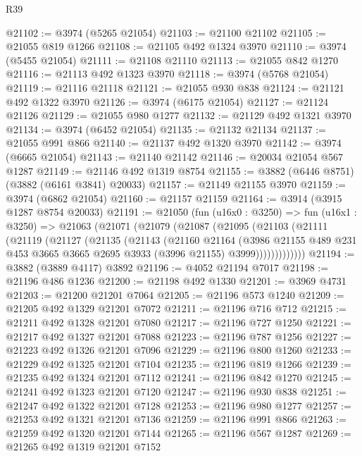\begin{lexlean}{R39}
\begin{coremodule}
@21102 := @3974 (@5265 @21054)
@21103 := @21100 @21102
@21105 := @21055 @819 @1266
@21108 := @21105 @492 @1324 @3970
@21110 := @3974 (@5455 @21054)
@21111 := @21108 @21110
@21113 := @21055 @842 @1270
@21116 := @21113 @492 @1323 @3970
@21118 := @3974 (@5768 @21054)
@21119 := @21116 @21118
@21121 := @21055 @930 @838
@21124 := @21121 @492 @1322 @3970
@21126 := @3974 (@6175 @21054)
@21127 := @21124 @21126
@21129 := @21055 @980 @1277
@21132 := @21129 @492 @1321 @3970
@21134 := @3974 (@6452 @21054)
@21135 := @21132 @21134
@21137 := @21055 @991 @866
@21140 := @21137 @492 @1320 @3970
@21142 := @3974 (@6665 @21054)
@21143 := @21140 @21142
@21146 := @20034 @21054 @567 @1287
@21149 := @21146 @492 @1319 @8754
@21155 := @3882 (@6446 @8751) (@3882 (@6161 @3841) @20033)
@21157 := @21149 @21155 @3970
@21159 := @3974 (@6862 @21054)
@21160 := @21157 @21159
@21164 := @3914 (@3915 @1287 @8754 @20033)
@21191 := @21050
    (fun (u16x0 : @3250) =>
    fun (u16x1 : @3250) =>
    @21063
      (@21071
        (@21079
          (@21087
            (@21095
              (@21103
                (@21111
                  (@21119
                    (@21127
                      (@21135
                        (@21143
                          (@21160
                            @21164
                            (@3986
                              @21155
                              @489
                              @231
                              @453
                              @3665
                              @3665
                              @2695
                              @3933
                              (@3996 @21155)
                              @3999)))))))))))))
@21194 := @3882 (@3889 @4117) @3892
@21196 := @4052 @21194 @7017
@21198 := @21196 @486 @1236
@21200 := @21198 @492 @1330
@21201 := @3969 @4731
@21203 := @21200 @21201 @7064
@21205 := @21196 @573 @1240
@21209 := @21205 @492 @1329 @21201 @7072
@21211 := @21196 @716 @712
@21215 := @21211 @492 @1328 @21201 @7080
@21217 := @21196 @727 @1250
@21221 := @21217 @492 @1327 @21201 @7088
@21223 := @21196 @787 @1256
@21227 := @21223 @492 @1326 @21201 @7096
@21229 := @21196 @800 @1260
@21233 := @21229 @492 @1325 @21201 @7104
@21235 := @21196 @819 @1266
@21239 := @21235 @492 @1324 @21201 @7112
@21241 := @21196 @842 @1270
@21245 := @21241 @492 @1323 @21201 @7120
@21247 := @21196 @930 @838
@21251 := @21247 @492 @1322 @21201 @7128
@21253 := @21196 @980 @1277
@21257 := @21253 @492 @1321 @21201 @7136
@21259 := @21196 @991 @866
@21263 := @21259 @492 @1320 @21201 @7144
@21265 := @21196 @567 @1287
@21269 := @21265 @492 @1319 @21201 @7152

\end{coremodule}
\end{lexlean}
